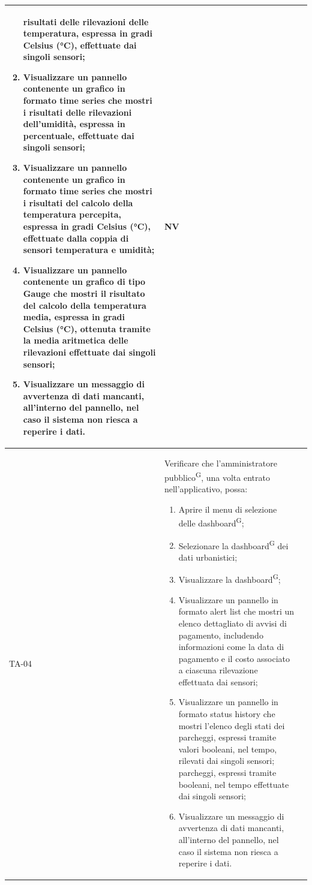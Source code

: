 \documentclass[8pt]{article}
\newcommand{\glossterm}[1]{#1\textsuperscript{G}} %
\begin{document}
\begin{longtable}{|>{\centering}p{2cm}|>{\RaggedRight}m{12cm}|>{\centering\arraybackslash}p{2cm}|}
\begin{enumerate}
            risultati delle rilevazioni delle temperatura, espressa in gradi Celsius (°C),
            effettuate dai singoli sensori;
        \item Visualizzare un pannello contenente un grafico in formato time series che mostri i
            risultati delle rilevazioni dell’umidità, espressa in percentuale, effettuate dai
            singoli sensori;
        \item Visualizzare un pannello contenente un grafico in formato time series che mostri i
            risultati del calcolo della temperatura percepita, espressa in gradi Celsius (°C),
            effettuate dalla coppia di sensori temperatura e umidità;
        \item Visualizzare un pannello contenente un grafico di tipo Gauge che mostri il risultato
            del calcolo della temperatura media, espressa in gradi Celsius (°C), ottenuta tramite la
            media aritmetica delle rilevazioni effettuate dai singoli sensori;
        \item Visualizzare un messaggio di avvertenza di dati mancanti, all’interno del pannello, nel caso il sistema non riesca a reperire i dati.
    \end{enumerate}
    & NV \\
    \hline
    TA-04 & Verificare che l’\glossterm{amministratore pubblico}, una volta entrato nell'applicativo, possa:
    \begin{enumerate}
        \setlength\itemsep{0em}
        \item Aprire il menu di selezione delle \glossterm{dashboard};
        \item Selezionare la \glossterm{dashboard} dei dati urbanistici;
        \item Visualizzare la \glossterm{dashboard};
        \item Visualizzare un pannello in formato alert list che mostri un elenco dettagliato di
            avvisi di pagamento, includendo informazioni come la data di pagamento e il costo
            associato a ciascuna rilevazione effettuata dai sensori;
        \item Visualizzare un pannello in formato status history che mostri l'elenco degli stati dei
            parcheggi, espressi tramite valori booleani, nel tempo, rilevati dai singoli sensori;
            parcheggi, espressi tramite booleani, nel tempo effettuate dai singoli sensori;
        \item Visualizzare un messaggio di avvertenza di dati mancanti, all’interno del pannello, nel caso il sistema non riesca a reperire i dati.

\end{enumerate}
\end{longtable}
\end{document}
